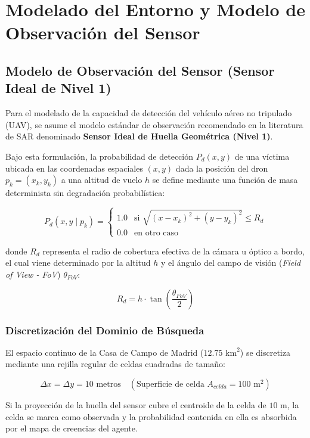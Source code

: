 \chapter{Modelado del Entorno y Modelo de Observación del Sensor}
\label{cap:modelado}

\section{Modelo de Observación del Sensor (Sensor Ideal de Nivel 1)}
Para el modelado de la capacidad de detección del vehículo aéreo no tripulado (UAV), se asume el modelo estándar de observación recomendado en la literatura de SAR denominado \textbf{Sensor Ideal de Huella Geométrica (Nivel 1)}.

Bajo esta formulación, la probabilidad de detección $P_d(x,y)$ de una víctima ubicada en las coordenadas espaciales $(x,y)$ dada la posición del dron $p_k = (x_k, y_k)$ a una altitud de vuelo $h$ se define mediante una función de masa determinista sin degradación probabilística:

\begin{equation}
P_d(x,y \mid p_k) = \begin{cases} 
1.0 & \text{si } \sqrt{(x - x_k)^2 + (y - y_k)^2} \le R_d \\ 
0.0 & \text{en otro caso} 
\end{cases}
\end{equation}

donde $R_d$ representa el radio de cobertura efectiva de la cámara u óptico a bordo, el cual viene determinado por la altitud $h$ y el ángulo del campo de visión (\textit{Field of View - FoV}) $\theta_{FoV}$:

\begin{equation}
R_d = h \cdot \tan\left(\frac{\theta_{FoV}}{2}\right)
\end{equation}

\subsection{Discretización del Dominio de Búsqueda}
El espacio continuo de la Casa de Campo de Madrid ($12.75\text{ km}^2$) se discretiza mediante una rejilla regular de celdas cuadradas de tamaño:

\begin{equation}
\Delta x = \Delta y = 10\text{ metros} \quad (\text{Superficie de celda } A_{celda} = 100\text{ m}^2)
\end{equation}

Si la proyección de la huella del sensor cubre el centroide de la celda de $10\text{ m}$, la celda se marca como observada y la probabilidad contenida en ella es absorbida por el mapa de creencias del agente.
